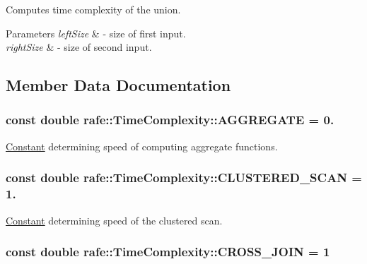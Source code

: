 Computes time complexity of the union. 
\begin{DoxyParams}{Parameters}
{\em left\+Size} & -\/ size of first input. \\
\hline
{\em right\+Size} & -\/ size of second input. \\
\hline
\end{DoxyParams}


\subsection{Member Data Documentation}
\hypertarget{classrafe_1_1_time_complexity_a4a637f321994988a43c70987319deeb0}{
\subsubsection[{A\+G\+G\+R\+E\+G\+A\+T\+E}]{\setlength{\rightskip}{0pt plus 5cm}const double rafe\+::\+Time\+Complexity\+::\+A\+G\+G\+R\+E\+G\+A\+T\+E = 0.\hspace{0.3cm}{\ttfamily [static]}}}\label{classrafe_1_1_time_complexity_a4a637f321994988a43c70987319deeb0}
\hyperlink{classrafe_1_1_constant}{Constant} determining speed of computing aggregate functions. \hypertarget{classrafe_1_1_time_complexity_a9801e942ee0c40046ceb756c07dc92cc}{
\subsubsection[{C\+L\+U\+S\+T\+E\+R\+E\+D\+\_\+\+S\+C\+A\+N}]{\setlength{\rightskip}{0pt plus 5cm}const double rafe\+::\+Time\+Complexity\+::\+C\+L\+U\+S\+T\+E\+R\+E\+D\+\_\+\+S\+C\+A\+N = 1.\hspace{0.3cm}{\ttfamily [static]}}}\label{classrafe_1_1_time_complexity_a9801e942ee0c40046ceb756c07dc92cc}
\hyperlink{classrafe_1_1_constant}{Constant} determining speed of the clustered scan. \hypertarget{classrafe_1_1_time_complexity_af640f31f8fa80c928f0a1cd6c819443c}{
\subsubsection[{C\+R\+O\+S\+S\+\_\+\+J\+O\+I\+N}]{\setlength{\rightskip}{0pt plus 5cm}const double rafe\+::\+Time\+Complexity\+::\+C\+R\+O\+S\+S\+\_\+\+J\+O\+I\+N = 1\hspace{0.3cm}{\ttfamily [static]}}}\label{classrafe_1_1_time_complexity_af640f31f8fa80c928f0a1cd6c819443c}
